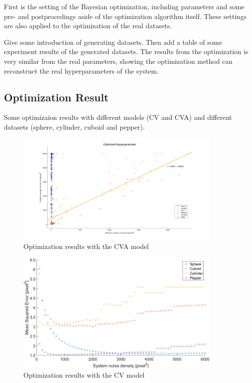 First is the setting of the Bayesian optimization, including parameters and some pre- and postprocedings aside of the optimization algorithm itself. These settings are also applied to the optimization of the real datasets.

Give some introduction of generating datasets. Then add a table of some experiment results of the generated datasets. The results from the optimization is very similar from the real parameters, showing the optimization method can reconstruct the real hyperparameters of the system.


\subsection{Optimization Result}

Some optimizaion results with different models (CV and CVA) and different datasets (sphere, cylinder, cuboid and pepper).



\begin{figure}[htbp]
\centering
\includegraphics[width=0.9\textwidth]{figures/KF/opt-linear.png}
\caption{Optimization results with the CVA model}
\label{opt cva}
\end{figure}

\begin{figure}[htbp]
\centering
\includegraphics[width=0.9\textwidth]{figures/KF/CV result.png}
\caption{Optimization results with the CV model}
\label{opt cv}
\end{figure}


